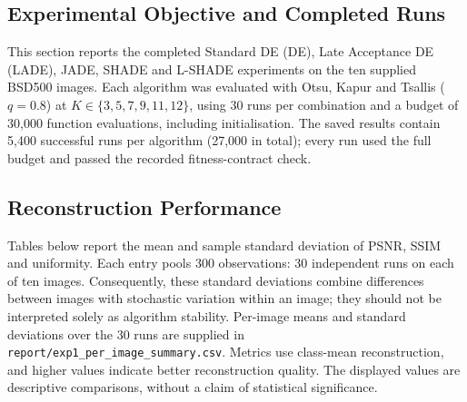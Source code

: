 \documentclass[review,authoryear]{elsarticle}
\begin{document}
\label{sec:experiment1}

\subsection{Experimental Objective and Completed Runs}

This section reports the completed Standard DE (DE), Late Acceptance DE (LADE), JADE, SHADE and L-SHADE experiments on the ten supplied BSD500 images. Each algorithm was evaluated with Otsu, Kapur and Tsallis ($q=0.8$) at $K\in\{3,5,7,9,11,12\}$, using 30 runs per combination and a budget of 30,000 function evaluations, including initialisation. The saved results contain 5,400 successful runs per algorithm (27,000 in total); every run used the full budget and passed the recorded fitness-contract check.

\subsection{Reconstruction Performance}

Tables below report the mean and sample standard deviation of PSNR, SSIM and uniformity. Each entry pools 300 observations: 30 independent runs on each of ten images. Consequently, these standard deviations combine differences between images with stochastic variation within an image; they should not be interpreted solely as algorithm stability. Per-image means and standard deviations over the 30 runs are supplied in \texttt{report/exp1\_per\_image\_summary.csv}. Metrics use class-mean reconstruction, and higher values indicate better reconstruction quality. The displayed values are descriptive comparisons, without a claim of statistical significance.

\begin{table}[htbp]
\centering
\small
\caption{PSNR (dB) on BSD500 using Otsu: pooled mean $\pm$ sample standard deviation across 300 observations per entry (10 images, 30 runs each).}
\label{tab:bsd-otsu-psnr}
\end{table}
\end{document}
